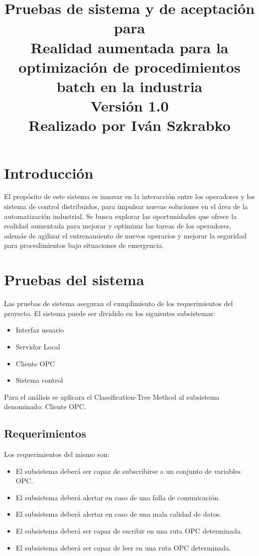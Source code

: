 \documentclass[]{scrreprt}
\title{
\flushleft
\Huge{Pruebas de sistema y de aceptación}\\
\vspace{1cm}
para\\
\vspace{1cm}
Realidad aumentada para la optimización de procedimientos batch en la industria\\
\vspace{1cm}
\LARGE{Versión 1.0\\}
\vspace{1cm}
Realizado por Iván Szkrabko\\
}
\begin{document}
\maketitle
\tableofcontents
\chapter{Introducción}
El propósito de este sistema es innovar en la interacción entre los operadores y los sistema de
control distribuidos, para impulsar nuevas soluciones en el área de la automatización industrial.
Se busca explorar las oportunidades que ofrece la realidad aumentada para mejorar y optimizar
las tareas de los operadores, además de agilizar el entrenamiento de nuevos operarios y mejorar
la seguridad para procedimientos bajo situaciones de emergencia.

\chapter{Pruebas del sistema}
Las pruebas de sistema aseguran el cumplimiento de los requerimientos del proyecto. El sistema puede ser dividido en los siguientes subsistemas:


\begin{itemize}
	\item Interfaz usuario
	\item Servidor Local
	\item Cliente OPC
	\item Sistema control
\end{itemize}

Para el análisis se aplicara el Classification-Tree Method al subsistema denominado: Cliente OPC.

\section{Requerimientos}

Los requerimientos del mismo son:
\begin{itemize}
	\item El subsistema deberá ser capaz de subscribirse a un conjunto de variables OPC.
	\item El subsistema deberá alertar en caso de una falla de comunicación.
	\item El subsistema deberá alertar en caso de una mala calidad de datos.
	\item El subsistema deberá ser capaz de escribir en una ruta OPC determinada.
	\item El subsistema deberá ser capaz de leer en una ruta OPC determinada.
\end{itemize}
\end{document}
